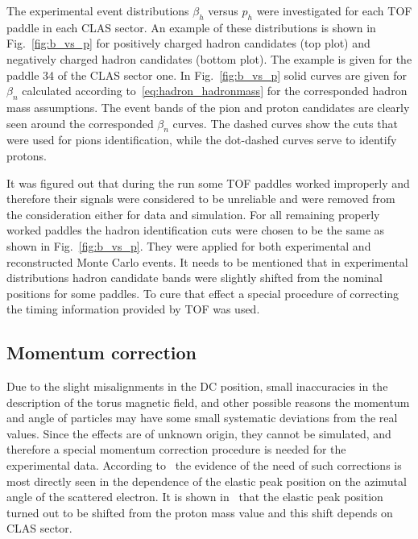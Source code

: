 \documentclass[prc,twocolumn,superscriptaddress,showpacs,amssymb,amsmath,amsfonts,linenumbers,aps]{revtex4-1}
\begin{document}
The experimental event distributions $\beta_{h}$ versus $p_{h}$ were investigated for each TOF paddle in each CLAS sector. An example of these distributions is shown in Fig.~\ref{fig:b_vs_p} for positively charged hadron candidates (top plot) and negatively charged hadron candidates (bottom plot). 
 The example is given for the paddle 34 of the CLAS sector one. In Fig.~\ref{fig:b_vs_p} solid curves are given for $\beta_{n}$ calculated according to~\eqref{eq:hadron_hadronmass} for the corresponded hadron mass assumptions. 
The event bands of the pion and proton candidates are clearly seen around the corresponded $\beta_{n}$ curves.  
The dashed curves show the cuts that were used for pions identification, while the dot-dashed curves serve to identify protons. 

It was figured out that during the run some TOF paddles worked improperly and therefore their signals were considered to be unreliable and were removed from the consideration either for data and simulation. 
For all remaining properly worked paddles the hadron identification cuts were chosen to be the same as shown in Fig.~\ref{fig:b_vs_p}. They were applied for both experimental and reconstructed Monte Carlo events. It needs to be mentioned that in experimental distributions hadron candidate bands were slightly shifted from the nominal positions for some paddles. To cure that effect a special procedure of correcting the timing information provided by TOF was used.




\subsection{Momentum correction}

Due to the slight misalignments in the DC position,  small inaccuracies in
the description of the torus magnetic field, and other possible reasons the momentum and angle of
particles may have some small systematic deviations from the real values. 
Since the effects are of unknown origin, they cannot be simulated, and therefore a special  momentum correction procedure is needed for the experimental data. 
According to~\cite{KPark:momcorr} the evidence of the need of such corrections is most directly seen in the dependence of the elastic peak position on the azimutal angle of the scattered electron. It is shown in~\cite{KPark:momcorr} that the elastic peak position turned out to be shifted from the proton mass value and this shift depends on CLAS sector. 
\end{document}
